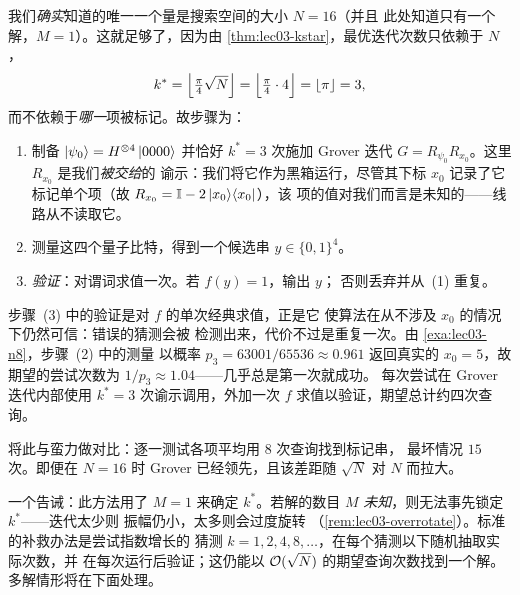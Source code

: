 \begin{example}
我们\emph{确实}知道的唯一一个量是搜索空间的大小 $N=16$（并且
此处知道只有一个解，$M=1$）。这就足够了，因为由
\cref{thm:lec03-kstar}，最优迭代次数只依赖于 $N$，
\[
  k^{\ast}=\Bigl\lfloor\tfrac{\pi}{4}\sqrt{N}\Bigr\rfloor
         =\Bigl\lfloor\tfrac{\pi}{4}\cdot4\Bigr\rfloor=\lfloor\pi\rfloor=3,
\]
而不依赖于\emph{哪一}项被标记。故步骤为：
\begin{enumerate}[label=(\arabic*),leftmargin=1.9em,itemsep=1pt,topsep=2pt]
  \item 制备 $\ket{\psi_0}=H^{\otimes4}\ket{0000}$ 并恰好 $k^{\ast}=3$ 次施加 Grover 迭代
        $G=R_{\psi_0}R_{x_0}$。这里 $R_{x_0}$ 是我们\emph{被交给}的
        谕示：我们将它作为黑箱运行，尽管其下标
        $x_0$ 记录了它标记单个项（故 $R_{x_0}=\mathbb{I}-2\ket{x_0}\!\bra{x_0}$），该
        项的值对我们而言是未知的——线路从不读取它。
  \item 测量这四个量子比特，得到一个候选串 $y\in\{0,1\}^4$。
  \item \emph{验证}：对谓词求值一次。若 $f(y)=1$，输出 $y$；
        否则丢弃并从~(1) 重复。
\end{enumerate}
步骤~(3) 中的验证是对 $f$ 的单次经典求值，正是它
使算法在从不涉及 $x_0$ 的情况下仍然可信：错误的猜测会被
检测出来，代价不过是重复一次。由 \cref{exa:lec03-n8}，步骤~(2) 中的测量
以概率 $p_3=63001/65536\approx0.961$ 返回真实的 $x_0=5$，故
期望的尝试次数为 $1/p_3\approx1.04$——几乎总是第一次就成功。
每次尝试在 Grover 迭代内部使用 $k^{\ast}=3$ 次谕示调用，外加一次
$f$ 求值以验证，期望总计约四次查询。

将此与蛮力做对比：逐一测试各项平均用 $8$ 次查询找到标记串，
最坏情况 $15$ 次。即便在 $N=16$ 时 Grover
已经领先，且该差距随 $\sqrt N$ 对 $N$ 而拉大。

一个告诫：此方法用了 $M=1$ 来确定 $k^{\ast}$。若解的数目 $M$
\emph{未知}，则无法事先锁定 $k^{\ast}$——迭代太少则
振幅仍小，太多则会过度旋转
（\cref{rem:lec03-overrotate}）。标准的补救办法是尝试指数增长的
猜测 $k=1,2,4,8,\dots$，在每个猜测以下随机抽取实际次数，并
在每次运行后验证；这仍能以 $\mathcal{O}(\sqrt N)$ 的期望查询次数找到一个解。多解情形将在下面处理。
\end{example}

